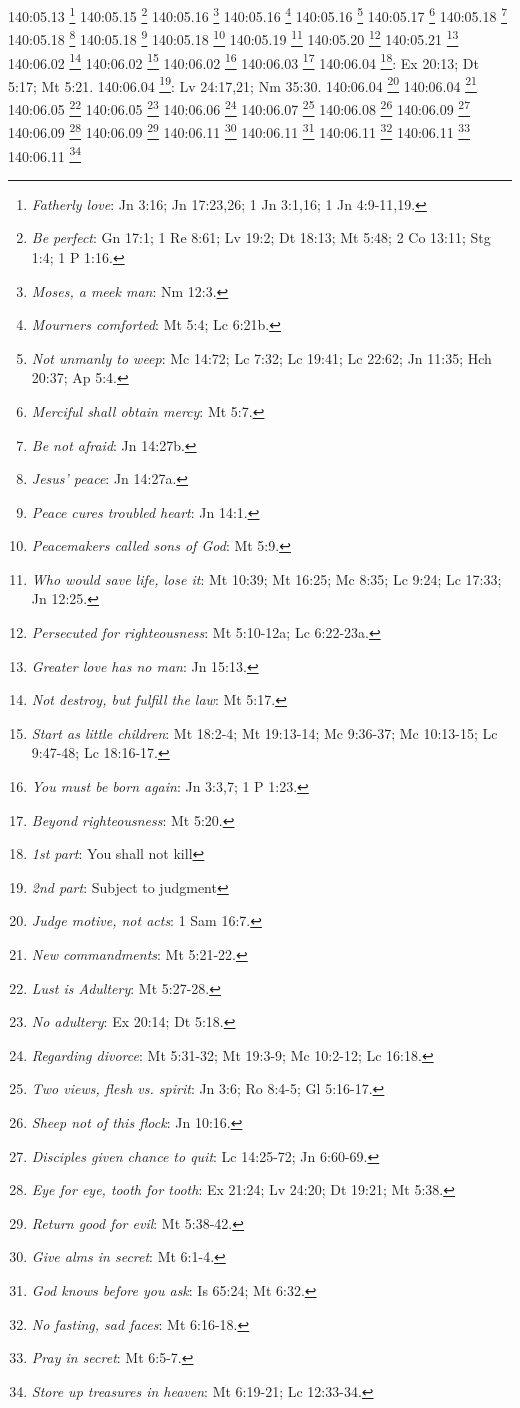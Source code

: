 {{{140:05.13 \footnote{\textit{Fatherly love}: Jn 3:16; Jn 17:23,26; 1 Jn 3:1,16; 1 Jn 4:9-11,19.}
140:05.15 \footnote{\textit{Be perfect}: Gn 17:1; 1 Re 8:61; Lv 19:2; Dt 18:13; Mt 5:48; 2 Co 13:11; Stg 1:4; 1 P 1:16.}
140:05.16 \footnote{\textit{Moses, a meek man}: Nm 12:3.}
140:05.16 \footnote{\textit{Mourners comforted}: Mt 5:4; Lc 6:21b.}
140:05.16 \footnote{\textit{Not unmanly to weep}: Mc 14:72; Lc 7:32; Lc 19:41; Lc 22:62; Jn 11:35; Hch 20:37; Ap 5:4.}
140:05.17 \footnote{\textit{Merciful shall obtain mercy}: Mt 5:7.}
140:05.18 \footnote{\textit{Be not afraid}: Jn 14:27b.}
140:05.18 \footnote{\textit{Jesus' peace}: Jn 14:27a.}
140:05.18 \footnote{\textit{Peace cures troubled heart}: Jn 14:1.}
140:05.18 \footnote{\textit{Peacemakers called sons of God}: Mt 5:9.}
140:05.19 \footnote{\textit{Who would save life, lose it}: Mt 10:39; Mt 16:25; Mc 8:35; Lc 9:24; Lc 17:33; Jn 12:25.}
140:05.20 \footnote{\textit{Persecuted for righteousness}: Mt 5:10-12a; Lc 6:22-23a.}
140:05.21 \footnote{\textit{Greater love has no man}: Jn 15:13.}
140:06.02 \footnote{\textit{Not destroy, but fulfill the law}: Mt 5:17.}
140:06.02 \footnote{\textit{Start as little children}: Mt 18:2-4; Mt 19:13-14; Mc 9:36-37; Mc 10:13-15; Lc 9:47-48; Lc 18:16-17.}
140:06.02 \footnote{\textit{You must be born again}: Jn 3:3,7; 1 P 1:23.}
140:06.03 \footnote{\textit{Beyond righteousness}: Mt 5:20.}
140:06.04 \footnote{\textit{1st part}: You shall not kill}: Ex 20:13; Dt 5:17; Mt 5:21.}
140:06.04 \footnote{\textit{2nd part}: Subject to judgment}: Lv 24:17,21; Nm 35:30.}
140:06.04 \footnote{\textit{Judge motive, not acts}: 1 Sam 16:7.}
140:06.04 \footnote{\textit{New commandments}: Mt 5:21-22.}
140:06.05 \footnote{\textit{Lust is Adultery}: Mt 5:27-28.}
140:06.05 \footnote{\textit{No adultery}: Ex 20:14; Dt 5:18.}
140:06.06 \footnote{\textit{Regarding divorce}: Mt 5:31-32; Mt 19:3-9; Mc 10:2-12; Lc 16:18.}
140:06.07 \footnote{\textit{Two views, flesh vs. spirit}: Jn 3:6; Ro 8:4-5; Gl 5:16-17.}
140:06.08 \footnote{\textit{Sheep not of this flock}: Jn 10:16.}
140:06.09 \footnote{\textit{Disciples given chance to quit}: Lc 14:25-72; Jn 6:60-69.}
140:06.09 \footnote{\textit{Eye for eye, tooth for tooth}: Ex 21:24; Lv 24:20; Dt 19:21; Mt 5:38.}
140:06.09 \footnote{\textit{Return good for evil}: Mt 5:38-42.}
140:06.11 \footnote{\textit{Give alms in secret}: Mt 6:1-4.}
140:06.11 \footnote{\textit{God knows before you ask}: Is 65:24; Mt 6:32.}
140:06.11 \footnote{\textit{No fasting, sad faces}: Mt 6:16-18.}
140:06.11 \footnote{\textit{Pray in secret}: Mt 6:5-7.}
140:06.11 \footnote{\textit{Store up treasures in heaven}: Mt 6:19-21; Lc 12:33-34.}
}

